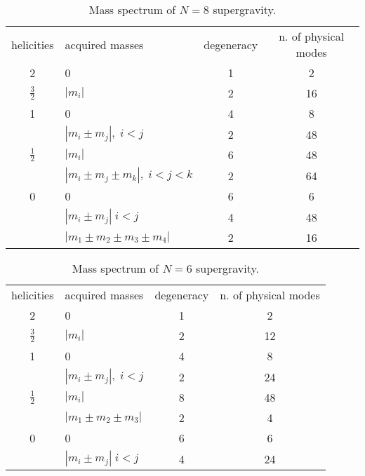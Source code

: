 \documentclass[a4paper,12pt]{article}
\begin{document}
\begin{table}[p]
\begin{center}
\begin{tabular} {|c|l|c|c|}
\cline{1-4}  helicities& acquired masses&degeneracy&n. of physical
modes
\\ \cline{1-4}
2&0&1&2\\ $\frac{3}{2}$&$|m_i|$&2&16\\ 1&0&4&8\\ &$|m_i\pm m_j|,\;
i<j$&2&48\\ $\frac{1}{2}$&$|m_i|$&6&48\\ &$|m_i\pm m_j\pm m_k|,\;
i < j < k$&2&64\\0&0&6&6\\&$|m_i\pm m_j|\; i<j$&4&48\\&$|m_1\pm
m_2\pm m_3\pm m_4|$&2&16
\\\cline{1-4}
\end{tabular}
\caption{Mass spectrum of $N=8$ supergravity.}\label{spectrum}
\end{center}
\end{table}


\begin{table}[p]
\begin{center}
\begin{tabular} {|c|l|c|c|}
\cline{1-4}  helicities& acquired masses&degeneracy&n. of physical
modes
\\ \cline{1-4}
2&0&1&2\\ $\frac{3}{2}$&$|m_i|$&2&12\\ 1&0&4&8\\ &$|m_i\pm m_j|,\;
i<j$&2&24\\ $\frac{1}{2}$&$|m_i|$&8&48\\ &$|m_1\pm m_2\pm
m_3|$&2&4\\ 0&0&6&6\\&$|m_i\pm m_j|\; i<j$&4&24
\\\cline{1-4}
\end{tabular}
\caption{Mass spectrum of $N=6$ supergravity.}\label{spectrum6}
\end{center}
\end{table}
\end{document}
